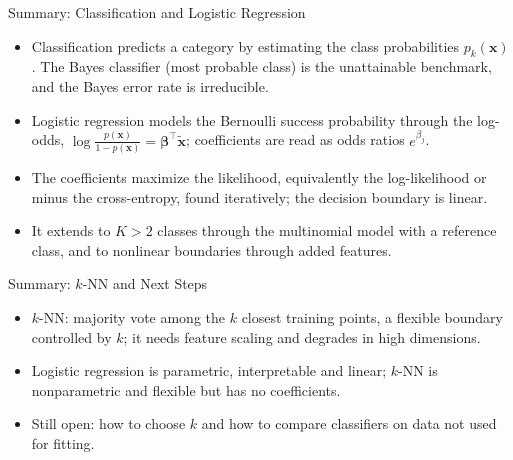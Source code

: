 \begin{frame}{Summary: Classification and Logistic Regression}
    \begin{itemize}
        \item Classification predicts a category by estimating the class probabilities $p_k(\mathbf{x})$. The Bayes classifier (most probable class) is the unattainable benchmark, and the Bayes error rate is irreducible.
        \item Logistic regression models the Bernoulli success probability through the log-odds, $\log \frac{p(\mathbf{x})}{1 - p(\mathbf{x})} = \symbf{\beta}^\top \tilde{\mathbf{x}}$; coefficients are read as odds ratios $e^{\beta_j}$.
        \item The coefficients maximize the likelihood, equivalently the log-likelihood or minus the cross-entropy, found iteratively; the decision boundary is linear.
        \item It extends to $K > 2$ classes through the multinomial model with a reference class, and to nonlinear boundaries through added features.
    \end{itemize}
\end{frame}


\begin{frame}{Summary: \texorpdfstring{$k$}{k}-NN and Next Steps}
    \begin{itemize}
        \item $k$-NN: majority vote among the $k$ closest training points, a flexible boundary controlled by $k$; it needs feature scaling and degrades in high dimensions.
        \item Logistic regression is parametric, interpretable and linear; $k$-NN is nonparametric and flexible but has no coefficients.
        \item Still open: how to choose $k$ and how to compare classifiers on data not used for fitting.
    \end{itemize}
\end{frame}
